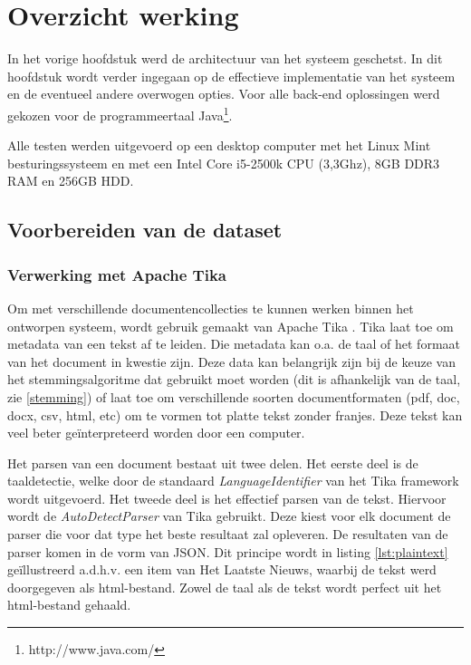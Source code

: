 \chapter{Overzicht werking}\label{hs:werking}

In het vorige hoofdstuk werd de architectuur van het systeem geschetst. In dit hoofdstuk wordt verder ingegaan op de effectieve implementatie van het systeem en de eventueel andere overwogen opties. Voor alle back-end oplossingen werd gekozen voor de programmeertaal Java\footnote{http://www.java.com/}. 

Alle testen werden  uitgevoerd op een desktop computer met het Linux Mint besturingssysteem en met een Intel Core i5-2500k CPU (3,3Ghz), 8GB DDR3 RAM en 256GB HDD. 

\section{Voorbereiden van de dataset}
\subsection{Verwerking met Apache Tika}\label{tika}
Om met verschillende documentencollecties te kunnen werken binnen het ontworpen systeem, wordt gebruik gemaakt van Apache Tika \cite{tika}. Tika laat toe om metadata van een tekst af te leiden. Die metadata kan o.a. de taal of het formaat van het document in kwestie zijn. Deze data kan belangrijk zijn bij de keuze van het stemmingsalgoritme dat gebruikt moet worden (dit is afhankelijk van de taal, zie \ref{stemming}) of laat toe om verschillende soorten documentformaten (pdf, doc, docx, csv, html, etc) om te vormen tot platte tekst zonder franjes. Deze tekst kan veel beter ge\"interpreteerd worden door een computer.

Het parsen van een document bestaat uit twee delen. Het eerste deel is de taaldetectie, welke door de standaard \textit{LanguageIdentifier} van het Tika framework wordt uitgevoerd. Het tweede deel is het effectief parsen van de tekst. Hiervoor wordt de \textit{AutoDetectParser} van Tika gebruikt. Deze kiest voor elk document de parser die voor dat type het beste resultaat zal opleveren.
De resultaten van de parser komen in de vorm van JSON. Dit principe wordt in listing \ref{lst:plaintext} ge\"illustreerd a.d.h.v. een item van Het Laatste Nieuws, waarbij de tekst werd doorgegeven als html-bestand. Zowel de taal als de tekst wordt perfect uit het html-bestand gehaald.


